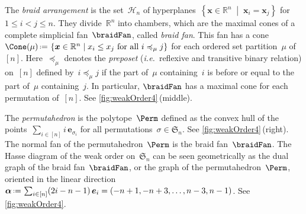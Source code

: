 \documentclass{amsart}
\theoremstyle{definition}
\newcommand{\R}{\mathbb{R}} %
\newcommand{\f}[1]{{\mathfrak{#1}}} %
\renewcommand{\b}[1]{{\boldsymbol{#1}}} %
\newcommand{\set}[2]{\left\{ #1 \;\middle|\; #2 \right\}} %
\newcommand{\bigset}[2]{\big\{ #1 \;\big|\; #2 \big\}} %
\newcommand{\one}{{\mathbb{1}}} %
\newcommand{\eqdef}{\mbox{\,\raisebox{0.2ex}{\scriptsize\ensuremath{\mathrm:}}\ensuremath{=}\,}} %
\newcommand{\ie}{\textit{i.e.}~} %
\newcommand{\darkblue}{\color{darkblue}} %
\newcommand{\defn}[1]{\textsl{\darkblue #1}} %
\newcommand{\HA}{\mathcal{H}} %
\newcommand{\hyp}{\mathbb{H}} %
\begin{document}
The \defn{braid arrangement} is the set~$\HA_n$ of hyperplanes~$\set{\b{x} \in \R^n}{\b{x}_i = \b{x}_j}$ for ${1 \le i < j \le n}$.
They divide~$\R^n$ into chambers, which are the maximal cones of a complete simplicial fan~$\braidFan$, called \defn{braid fan}.
This fan has a cone~$\Cone(\mu) \eqdef \set{\b{x} \in \R^n}{x_i \le x_j \text{ for all } i \preccurlyeq_\mu j}$ for each ordered set partition~$\mu$ of~$[n]$.
Here~$\preccurlyeq_\mu$ denotes the \defn{preposet} (\ie reflexive and transitive binary relation) on~$[n]$ defined by~$i \preccurlyeq_\mu j$ if the part of~$\mu$ containing~$i$ is before or equal to the part of~$\mu$ containing~$j$.
In particular, $\braidFan$ has a maximal cone for each permutation of~$[n]$.
See \cref{fig:weakOrder4}\,(middle).

The \defn{permutahedron} is the polytope~$\Perm$ defined as the convex hull of the points~$\sum_{i \in [n]} i \, \b{e}_{\sigma_i}$ for all permutations~$\sigma \in \f{S}_n$.
See \cref{fig:weakOrder4}\,(right).
The normal fan of the permutahedron~$\Perm$ is the braid fan~$\braidFan$.
The Hasse diagram of the weak order on~$\f{S}_n$ can be seen geometrically as the dual graph of the braid fan~$\braidFan$, or the graph of the permutahedron~$\Perm$, oriented in the linear direction~$\b{\alpha} \eqdef \sum_{i \in [n]} (2i-n-1) \, \b{e}_i = (-n+1, -n+3, \dots, n-3, n-1)$.
See \cref{fig:weakOrder4}.
\end{document}
